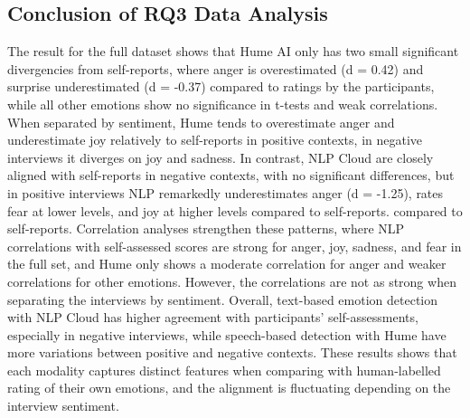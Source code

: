 \subsection{Conclusion of RQ3 Data Analysis}
The result for the full dataset shows that Hume AI only has two small significant divergencies from self-reports, where anger is overestimated (d = 0.42) and surprise underestimated (d = -0.37) compared to ratings by the participants, while all other emotions show no significance in t-tests and weak correlations. When separated by sentiment, Hume tends to overestimate anger and underestimate joy relatively to self-reports in positive contexts, in negative interviews it diverges on joy and sadness. 
In contrast, NLP Cloud are closely aligned with self-reports in negative contexts, with no significant differences, but in positive interviews NLP remarkedly underestimates anger (d = -1.25), rates fear at lower levels, and joy at higher levels compared to self-reports.  compared to self-reports. Correlation analyses strengthen these patterns, where NLP correlations with self-assessed scores are strong for anger, joy, sadness, and fear in the full set, and Hume only shows a moderate correlation for anger and weaker correlations for other emotions. However, the correlations are not as strong when separating the interviews by sentiment. 
Overall, text-based emotion detection with NLP Cloud has higher agreement with participants’ self-assessments, especially in negative interviews, while speech-based detection with Hume have more variations between positive and negative contexts. These results shows that each modality captures distinct features when comparing with human-labelled rating of their own emotions, and the alignment is fluctuating depending on the interview sentiment.  
  